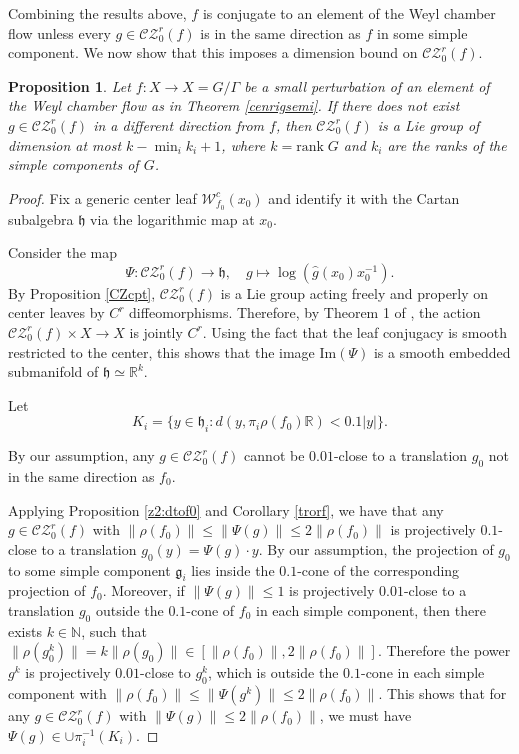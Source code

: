 \documentclass[11pt]{amsart}
\numberwithin{equation}{section}
\newcommand{\R}{\mathbb{R}}
\newcommand{\N}{\mathbb{N}}
\newcommand{\W}{\mathcal{W}}
\newcommand{\CZ}{\mathcal{CZ}}
\theoremstyle{plain}
\newtheorem{prop}[thm]{Proposition}
\begin{document}
Combining the results above, $f$ is conjugate to an element of the Weyl chamber flow unless every $g\in \CZ^r_0(f)$ is in the same direction as $f$ in some simple component. We now show that this imposes a dimension bound on $\CZ^r_0(f)$.


\begin{prop}\label{conerig}
Let $f:X\to X=G/\Gamma$ be a small perturbation of an element of the Weyl chamber flow as in Theorem \ref{cenrigsemi}. If there does not exist $g\in \CZ^r_0(f)$ in a different direction from $f$, then $\CZ^r_0(f)$ is a Lie group of dimension at most $k-\min_i k_i+1$, where $k=\mathrm{rank}\; G$ and $k_i$ are the ranks of the simple components of $G$. 
\end{prop}

\begin{proof}

Fix a generic center leaf $\W^c_{f_0}(x_0)$ and identify it with the Cartan subalgebra $\mathfrak{h}$ via the logarithmic map at $x_0$.

 Consider the map\[
\Psi: \CZ^r_0(f) \to \mathfrak{h}, \quad g \mapsto \log(\hat{g}(x_0)x_0^{-1}).
\]
By Proposition \ref{CZcpt}, $\CZ^r_0(f)$ is a Lie group acting freely and properly on center leaves by $C^r$ diffeomorphisms. Therefore, by Theorem 1 of \cite{BM}, the action $\CZ^r_0(f)\times X\to X$ is jointly $C^r$. Using the fact that the leaf conjugacy is smooth restricted to the center, this shows that the image $\mathrm{Im}(\Psi)$ is a smooth embedded submanifold of $\mathfrak{h}\simeq \R^k$.

Let
\[
K_i = \{y\in \mathfrak{h}_i: d(y, \pi_i\rho(f_0)\R) < 0.1 |y|\}.
\]

By our assumption, any $g\in \CZ^r_0(f)$ cannot be $0.01$-close to a translation $g_0$ not in the same direction as $f_0$.

Applying Proposition \ref{z2:dtof0} and Corollary \ref{trorf}, we have that any $g\in \CZ^r_0(f)$ with $\|\rho(f_0)\|\le \|\Psi(g)\|\le 2\|\rho(f_0)\|$ is projectively $0.1$-close to a translation $g_0(y)=\Psi(g)\cdot y$. By our assumption, the projection of $g_0$ to some simple component $\mathfrak{g}_i$ lies inside the $0.1$-cone of the corresponding projection of $f_0$. Moreover, if $\|\Psi(g)\|\le 1$ is projectively $0.01$-close to a translation $g_0$ outside the $0.1$-cone of $f_0$ in each simple component, then there exists $k\in \N$, such that $\|\rho(g_0^k)\|=k\|\rho(g_0)\|\in [\|\rho(f_0)\|,2\|\rho(f_0)\|]$. Therefore the power $g^k$ is projectively $0.01$-close to $g_0^k$, which is outside the $0.1$-cone in each simple component with $\|\rho(f_0)\|\le \|\Psi(g^k)\|\le 2\|\rho(f_0)\|$. This shows that for any $g\in \CZ^r_0(f)$ with $ \|\Psi(g)\|\le 2\|\rho(f_0)\|$, we must have $\Psi(g)\in \cup \pi_i^{-1}(K_i)$.


\end{proof}
\end{document}
